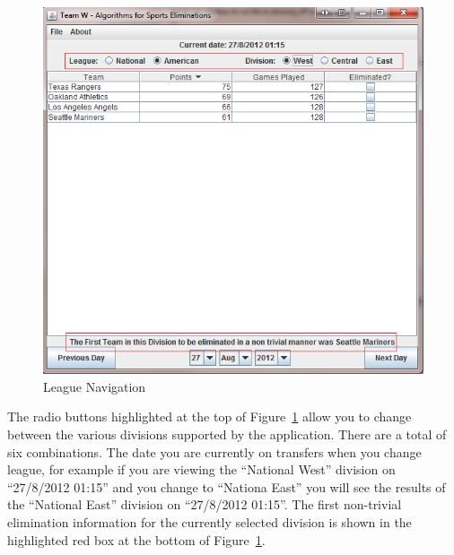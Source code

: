 \begin{figure}
  \includegraphics[width=\linewidth,keepaspectratio]{images/userManualDesk3.png}
  \caption{League Navigation}\label{fig:LEAGNAV}
\end{figure}
The radio buttons highlighted at the top of Figure~\ref{fig:LEAGNAV}
allow you to change between the various divisions supported by the
application. There are a total of six combinations. The date you
are currently on transfers when you change league, for example if you
are viewing the ``National West'' division on ``27/8/2012 01:15'' and
you change to ``Nationa East'' you will see the results of the
``National East'' division on ``27/8/2012 01:15''. The first
non-trivial elimination information for the currently selected
division is shown in the highlighted red box at the bottom of
Figure~\ref{fig:LEAGNAV}.

